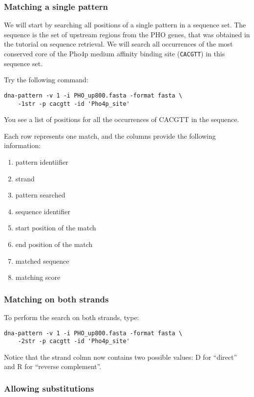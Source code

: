 \subsubsection{Matching a single pattern}

We will start by searching all positions of a single pattern in a
sequence set. The sequence is the set of upstream regions from the PHO
genes, that was obtained in the tutorial on sequence retrieval. We
will search all occurrences of the most conserved core of the Pho4p
medium affinity binding site (\texttt{CACGTT}) in this sequence set.

Try the following command:

\begin{verbatim}
dna-pattern -v 1 -i PHO_up800.fasta -format fasta \ 
    -1str -p cacgtt -id 'Pho4p_site'
\end{verbatim}

You see a list of positions for all the occurrences of CACGTT in the sequence.

Each row represents one match, and the columns provide the following
information:
\begin{enumerate}
\item pattern identiifier
\item strand
\item pattern searched
\item sequence identifier
\item start position of the match
\item end position of the match
\item matched sequence
\item matching score
\end{enumerate}

\subsubsection{Matching on both strands}

To perform the search on both strands, type:
\begin{verbatim}
dna-pattern -v 1 -i PHO_up800.fasta -format fasta \ 
    -2str -p cacgtt -id 'Pho4p_site'
\end{verbatim}

Notice that the strand colmn now contains two possible values: D for
``direct'' and R for ``reverse complement''.

\subsubsection{Allowing substitutions}

